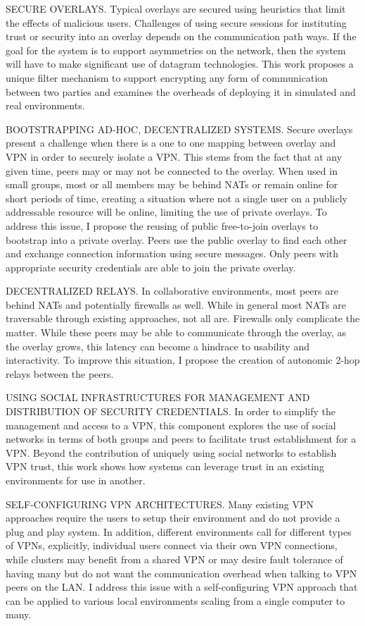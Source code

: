 SECURE OVERLAYS. Typical overlays are secured using heuristics that limit the
effects of malicious users.  Challenges of using secure sessions for
instituting trust or security into an overlay depends on the communication
path ways.  If the goal for the system is to support asymmetries on the
network, then the system will have to make significant use of datagram
technologies.  This work proposes a unique filter mechanism to support
encrypting any form of communication between two parties and examines the
overheads of deploying it in simulated and real environments.

BOOTSTRAPPING AD-HOC, DECENTRALIZED SYSTEMS. Secure overlays present a
challenge when there is a one to one mapping between overlay and VPN in order
to securely isolate a VPN.  This stems from the fact that at any given time,
peers may or may not be connected to the overlay.  When used in small groups,
most or all members may be behind NATs or remain online for short periods of
time, creating a situation where not a single user on a publicly addressable
resource will be online, limiting the use of private overlays.  To address
this issue, I propose the reusing of public free-to-join overlays to bootstrap
into a private overlay.  Peers use the public overlay to find each other and
exchange connection information using secure messages.  Only peers with
appropriate security credentials are able to join the private overlay.

DECENTRALIZED RELAYS. In collaborative environments, most peers are behind NATs
and potentially firewalls as well.  While in general most NATs are traversable
through existing approaches, not all are.  Firewalls only complicate the
matter.  While these peers may be able to communicate through the overlay, as
the overlay grows, this latency can become a hindrace to usability and
interactivity.  To improve this situation, I propose the creation of autonomic
2-hop relays between the peers.

USING SOCIAL INFRASTRUCTURES FOR MANAGEMENT AND DISTRIBUTION OF SECURITY
CREDENTIALS. In order to simplify the management and access to a VPN, this
component explores the use of social networks in terms of both groups and
peers to facilitate trust establishment for a VPN.  Beyond the contribution of
uniquely using social networks to establish VPN trust, this work shows how
systems can leverage trust in an existing environments for use in another.

SELF-CONFIGURING VPN ARCHITECTURES. Many existing VPN approaches require the
users to setup their environment and do not provide a plug and play system.  In
addition, different environments call for different types of VPNs, explicitly,
individual users connect via their own VPN connections, while clusters may
benefit from a shared VPN or may desire fault tolerance of having many but do
not want the communication overhead when talking to VPN peers on the LAN.  I
address this issue with a self-configuring VPN approach that can be applied to
various local environments scaling from a single computer to many.

